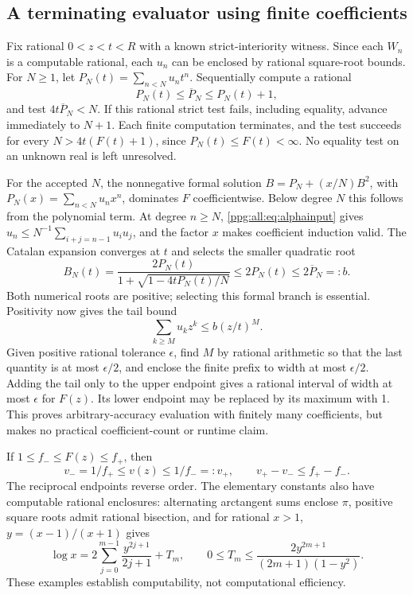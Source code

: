 \documentclass[11pt,letterpaper]{article}
\theoremstyle{remark}\newtheorem{remark}[theorem]{Remark}
\numberwithin{equation}{section}
\begin{document}
\subsection{A terminating evaluator using finite coefficients}
Fix rational $0<z<t<R$ with a known strict-interiority witness. Since each $W_n$ is a computable rational, each $u_n$ can be enclosed by rational square-root bounds. For $N\ge1$, let $P_N(t)=\sum_{n<N}u_nt^n$. Sequentially compute a rational
\[
 P_N(t)\le\overline P_N\le P_N(t)+1,
\]
and test $4t\overline P_N<N$. If this rational strict test fails, including equality, advance immediately to $N+1$. Each finite computation terminates, and the test succeeds for every $N>4t(F(t)+1)$, since $P_N(t)\le F(t)<\infty$. No equality test on an unknown real is left unresolved.

For the accepted $N$, the nonnegative formal solution
$B=P_N+(x/N)B^2$, with $P_N(x)=\sum_{n<N}u_nx^n$, dominates $F$ coefficientwise. Below degree $N$ this follows from the polynomial term. At degree $n\ge N$, \eqref{ppg:all:eq:alphainput} gives
$u_n\le N^{-1}\sum_{i+j=n-1}u_iu_j$, and the factor $x$ makes coefficient induction valid. The Catalan expansion converges at $t$ and selects the smaller quadratic root
\[
 B_N(t)=\frac{2P_N(t)}{1+\sqrt{1-4tP_N(t)/N}}
        \le2P_N(t)\le2\overline P_N=:b.
\]
Both numerical roots are positive; selecting this formal branch is essential. Positivity now gives the tail bound
\begin{equation}\label{ppg:all:eq:tailF}
 \sum_{k\ge M}u_kz^k\le b(z/t)^M.
\end{equation}
Given positive rational tolerance $\epsilon$, find $M$ by rational arithmetic so that the last quantity is at most $\epsilon/2$, and enclose the finite prefix to width at most $\epsilon/2$. Adding the tail only to the upper endpoint gives a rational interval of width at most $\epsilon$ for $F(z)$. Its lower endpoint may be replaced by its maximum with 1. This proves arbitrary-accuracy evaluation with finitely many coefficients, but makes no practical coefficient-count or runtime claim.

If $1\le f_-\le F(z)\le f_+$, then
\begin{equation}\label{ppg:all:eq:vinterval}
 v_-=1/f_+\le v(z)\le1/f_-=:v_+,
 \qquad v_+-v_-\le f_+-f_-.
\end{equation}
The reciprocal endpoints reverse order. The elementary constants also have computable rational enclosures: alternating arctangent sums enclose $\pi$, positive square roots admit rational bisection, and for rational $x>1$, $y=(x-1)/(x+1)$ gives
\begin{equation}\label{ppg:all:eq:loginterval}
 \log x=2\sum_{j=0}^{m-1}\frac{y^{2j+1}}{2j+1}+T_m,
 \qquad 0\le T_m\le\frac{2y^{2m+1}}{(2m+1)(1-y^2)}.
\end{equation}
These examples establish computability, not computational efficiency.
\end{document}
